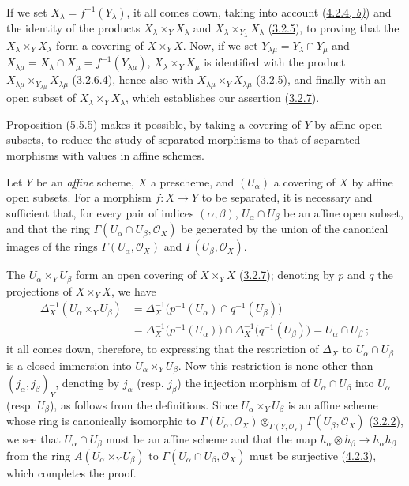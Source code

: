 If we set $X_\lambda=f^{-1}(Y_\lambda)$, it all comes down, taking into
account (\hyperref[I.4.2.4]{4.2.4, \emph{b)}}) and the identity of the products
$X_\lambda\times_Y X_\lambda$ and
$X_\lambda\times_{Y_\lambda}X_\lambda$
(\hyperref[I.3.2.5]{3.2.5}), to proving that the
$X_\lambda\times_Y X_\lambda$ form a covering of $X\times_Y X$. Now,
if we set $Y_{\lambda\mu}=Y_\lambda\cap Y_\mu$ and
$X_{\lambda\mu}=X_\lambda\cap X_\mu=f^{-1}(Y_{\lambda\mu})$,
$X_\lambda\times_Y X_\mu$ is identified with the product
$X_{\lambda\mu}\times_{Y_{\lambda\mu}}X_{\lambda\mu}$
(\hyperref[I.3.2.6.4]{3.2.6.4}), hence also with
$X_{\lambda\mu}\times_Y X_{\lambda\mu}$
(\hyperref[I.3.2.5]{3.2.5}), and finally with an open subset of
$X_\lambda\times_Y X_\lambda$, which establishes our assertion
(\hyperref[I.3.2.7]{3.2.7}).

Proposition (\hyperref[I.5.5.5]{5.5.5}) makes it possible, by taking a
covering of $Y$ by affine open subsets, to reduce the study of separated
morphisms to that of separated morphisms with values in affine schemes.

\begin{proposition}[5.5.6]
\label{I.5.5.6}
Let $Y$ be an \emph{affine} scheme, $X$ a prescheme, and $(U_\alpha)$ a covering of
$X$ by affine open subsets. For a morphism $f:X\to Y$ to be separated, it
is necessary and sufficient that, for every pair of indices $(\alpha,\beta)$,
$U_\alpha\cap U_\beta$ be an affine open subset, and that the ring
$\Gamma(U_\alpha\cap U_\beta,\mathscr{O}_X)$ be generated by the union of the
canonical images of the rings $\Gamma(U_\alpha,\mathscr{O}_X)$ and
$\Gamma(U_\beta,\mathscr{O}_X)$.
\end{proposition}

The $U_\alpha\times_Y U_\beta$ form an open covering of
$X\times_Y X$ (\hyperref[I.3.2.7]{3.2.7}); denoting by $p$ and $q$ the
projections of $X\times_Y X$, we have
\[
  \begin{aligned}
    \Delta_X^{-1}(U_\alpha\times_Y U_\beta)
      &=\Delta_X^{-1}\bigl(p^{-1}(U_\alpha)\cap q^{-1}(U_\beta)\bigr)\\
      &=\Delta_X^{-1}\bigl(p^{-1}(U_\alpha)\bigr)
        \cap\Delta_X^{-1}\bigl(q^{-1}(U_\beta)\bigr)
        =U_\alpha\cap U_\beta~;
  \end{aligned}
\]
it all comes down, therefore, to expressing that the restriction of
$\Delta_X$ to $U_\alpha\cap U_\beta$ is a closed immersion into
$U_\alpha\times_Y U_\beta$. Now this restriction is none other than
$(j_\alpha,j_\beta)_Y$, denoting by $j_\alpha$ (resp. $j_\beta$) the
injection morphism of $U_\alpha\cap U_\beta$ into $U_\alpha$ (resp.
$U_\beta$), as follows from the definitions. Since
$U_\alpha\times_Y U_\beta$ is an affine scheme whose ring is
canonically isomorphic to
$\Gamma(U_\alpha,\mathscr{O}_X)
 \otimes_{\Gamma(Y,\mathscr{O}_Y)}
 \Gamma(U_\beta,\mathscr{O}_X)$
(\hyperref[I.3.2.2]{3.2.2}), we see that $U_\alpha\cap U_\beta$ must be
an affine scheme and that the map
$h_\alpha\otimes h_\beta\to h_\alpha h_\beta$ from the ring
$A(U_\alpha\times_Y U_\beta)$ to
$\Gamma(U_\alpha\cap U_\beta,\mathscr{O}_X)$ must be surjective
(\hyperref[I.4.2.3]{4.2.3}), which completes the proof.

